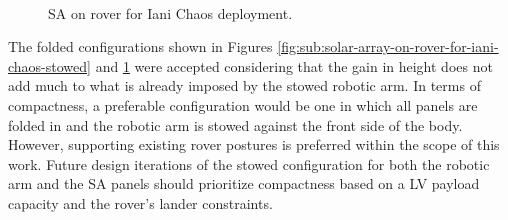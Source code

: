 \begin{figure}[h]
\begin{subfigure}[t]{\subfigureWidth}
		\label{fig:sub:solar-array-on-rover-for-iani-chaos-deployed}
	\end{subfigure}\\[0.8ex]
    \caption[Solar array on rover for Iani Chaos deployment]
            {\ac{SA} on rover for Iani Chaos deployment.}
    \label{fig:solar-array-on-rover-iani-chaos}
\vspace{-2ex}
\end{figure}

\vspace{0.5cm}

The folded configurations shown in Figures \ref{fig:sub:solar-array-on-rover-for-iani-chaos-stowed} and \ref{fig:sub:solar-array-on-rover-for-iani-chaos-deployed} were accepted considering that the gain in height does not add much to what is already imposed by the stowed robotic arm. In terms of compactness, a preferable configuration would be one in which all panels are folded in and the robotic arm is stowed against the front side of the body. However, supporting existing rover postures is preferred within the scope of this work. Future design iterations of the stowed configuration for both the robotic arm and the \ac{SA} panels should prioritize compactness based on a \ac{LV} payload capacity and the rover's lander constraints.

\vspace{0.5cm}

